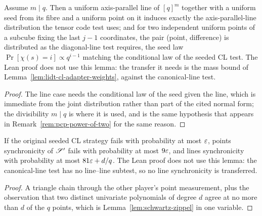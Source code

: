 \begin{lemma}
\label{lem:lidt-test-transfer}
Assume $m \mid q$. Then a uniform axis-parallel line of $[q]^m$ together with a uniform seed
from its fibre and a uniform point on it induces exactly the axis-parallel-line distribution
the tensor code test uses; and for two independent uniform points of a subcube fixing the last
$j - 1$ coordinates, the pair (point, difference) is distributed as the diagonal-line test
requires, the seed law $\Pr[\chi(s) = i] \propto q^{i-1}$ matching the conditional law of the
seeded CL test.
The Lean proof does not use this lemma: the transfer it needs is the mass bound of
Lemma~\ref{lem:lidt-cl-adapter-weights}, against the canonical-line test.
\end{lemma}

\begin{proof}
The line case needs the conditional law of the seed given the line, which is immediate from
the joint distribution rather than part of the cited normal form; the divisibility $m \mid q$ is
where it is used, and is the same hypothesis that appears in
Remark~\ref{rem:pcp-power-of-two} for the same reason.
\end{proof}

\effortMedium

\begin{lemma}
\label{lem:lidt-sync-transfer}
If the original seeded CL strategy fails with probability at most $\varepsilon$, points
synchronicity of $\mathscr{S}'$ fails with probability at most $9\varepsilon$, and lines
synchronicity with probability at most $81\varepsilon + d/q$.
The Lean proof does not use this lemma: the canonical-line test has no line--line subtest, so
no line synchronicity is transferred.
\end{lemma}

\begin{proof}
A triangle chain through the other player's point measurement, plus the observation that two
distinct univariate polynomials of degree $d$ agree at no more than $d$ of the $q$ points,
which is Lemma~\ref{lem:schwartz-zippel} in one variable.
\end{proof}

\effortMedium

